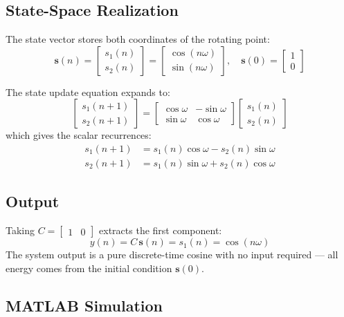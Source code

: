 \documentclass[11pt]{article}
\begin{document}
\subsection{State-Space Realization}

The state vector stores both coordinates of the rotating point:
\[
  \mathbf{s}(n) = \begin{bmatrix} s_1(n) \\ s_2(n) \end{bmatrix} = \begin{bmatrix} \cos(n\omega) \\ \sin(n\omega) \end{bmatrix}, \quad \mathbf{s}(0) = \begin{bmatrix} 1 \\ 0 \end{bmatrix}
\]

The state update equation expands to:
\[
  \begin{bmatrix} s_1(n+1) \\ s_2(n+1) \end{bmatrix}
  = \begin{bmatrix} \cos\omega & -\sin\omega \\ \sin\omega & \cos\omega \end{bmatrix}
  \begin{bmatrix} s_1(n) \\ s_2(n) \end{bmatrix}
\]
which gives the scalar recurrences:
\begin{align*}
  s_1(n+1) &= s_1(n)\cos\omega - s_2(n)\sin\omega \\
  s_2(n+1) &= s_1(n)\sin\omega + s_2(n)\cos\omega
\end{align*}

\subsection{Output}

Taking $C = \begin{bmatrix} 1 & 0 \end{bmatrix}$ extracts the first component:
\[
  y(n) = C\,\mathbf{s}(n) = s_1(n) = \cos(n\omega)
\]
The system output is a pure discrete-time cosine with no input required — all energy comes from the initial condition $\mathbf{s}(0)$.

\subsection{MATLAB Simulation}
\end{document}
